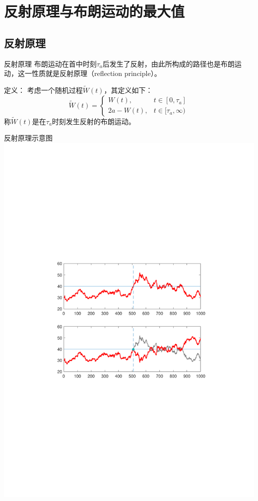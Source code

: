 \documentclass[t]{beamer}
\begin{document}
\section{反射原理与布朗运动的最大值}
\subsection{反射原理}
\begin{frame}{反射原理}
  布朗运动在首中时刻$\tau_a$后发生了反射，由此所构成的路径也是布朗运动，这一性质就是反射原理（reflection principle）。


  \begin{block}{定义：}
    考虑一个随机过程$\widetilde W(t)$，其定义如下：
	\begin{equation*}
	\widetilde W(t)=\begin{cases}
	W(t),& t\in[0,\tau_a]\\
	2a-W(t),& t\in[\tau_a,\infty)
	\end{cases}
	\end{equation*}
称$\widetilde W(t)$是在$\tau_a$时刻发生反射的布朗运动。
  \end{block}
\end{frame}


\begin{frame}{反射原理示意图}
  \centering
	\includegraphics[scale=.7]{fig/barrier.pdf}
\end{frame}
\end{document}
